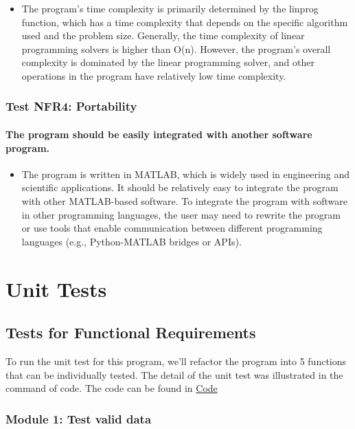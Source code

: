 \documentclass[12pt, titlepage]{article}
\begin{document}
\begin{itemize}
    \item The program's time complexity is primarily determined by the linprog function, which has a time complexity that depends on the specific algorithm used and the problem size. Generally, the time complexity of linear programming solvers is higher than O(n). However, the program's overall complexity is dominated by the linear programming solver, and other operations in the program have relatively low time complexity.
\end{itemize}
\subsubsection{Test NFR4: Portability}
		
\paragraph{The program should be easily integrated with another software program.}

\begin{itemize}
    \item The program is written in MATLAB, which is widely used in engineering and scientific applications. It should be relatively easy to integrate the program with other MATLAB-based software. To integrate the program with software in other programming languages, the user may need to rewrite the program or use tools that enable communication between different programming languages (e.g., Python-MATLAB bridges or APIs).
\end{itemize}

\section{Unit Tests} \label{utest}

\subsection{Tests for Functional Requirements}

To run the unit test for this program, we'll refactor the program into 5 functions that can be individually tested. The detail of the unit test was illustrated in the command of code. The code can be found in \href{https://github.com/KarenKarenWang/cas741_project1/tree/main/docs/Design/code}{Code}

\subsubsection{Module 1: Test valid data}
\end{document}
